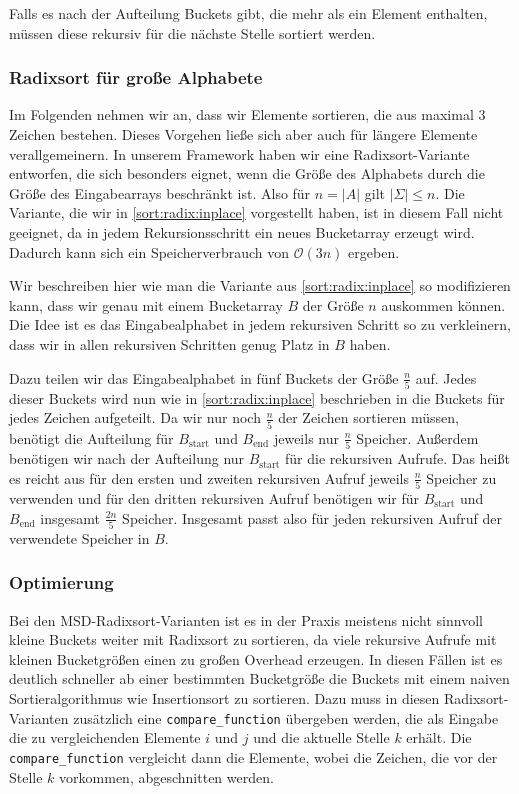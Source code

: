 Falls es nach der Aufteilung Buckets gibt, die mehr als ein Element enthalten,
müssen diese rekursiv für die nächste Stelle sortiert werden.

\subsubsection{Radixsort für große Alphabete}
\label{sort:radix:big_alph}

Im Folgenden nehmen wir an, dass wir Elemente sortieren,
die aus maximal $3$ Zeichen bestehen. Dieses Vorgehen ließe sich aber auch für längere Elemente verallgemeinern.
In unserem Framework haben wir eine Radixsort-Variante entworfen, die sich besonders eignet,
wenn die Größe des Alphabets durch die Größe des Eingabearrays beschränkt ist.
Also für $n=|A|$ gilt $|\Sigma| \le n$. Die Variante, die wir in \cref{sort:radix:inplace} vorgestellt haben,
ist in diesem Fall nicht geeignet, da in jedem Rekursionsschritt ein neues Bucketarray erzeugt wird.
Dadurch kann sich ein Speicherverbrauch von $\mathcal O(3n)$ ergeben.

Wir beschreiben hier wie man die Variante aus \cref{sort:radix:inplace} so modifizieren kann,
dass wir genau mit einem Bucketarray $B$ der Größe $n$ auskommen können.
Die Idee ist es das Eingabealphabet in jedem rekursiven Schritt so zu verkleinern,
dass wir in allen rekursiven Schritten genug Platz in $B$ haben.

Dazu teilen wir das Eingabealphabet in fünf Buckets der Größe $\frac{n}{5}$ auf.
Jedes dieser Buckets wird nun wie in \cref{sort:radix:inplace} beschrieben in die Buckets für jedes Zeichen aufgeteilt.
Da wir nur noch $\frac{n}{5}$ der Zeichen sortieren müssen,
benötigt die Aufteilung für $B_{\text{start}}$ und $B_{\text{end}}$ jeweils nur $\frac{n}{5}$ Speicher.
Außerdem benötigen wir nach der Aufteilung nur $B_{\text{start}}$ für die rekursiven Aufrufe.
Das heißt es reicht aus für den ersten und zweiten rekursiven Aufruf jeweils $\frac{n}{5}$ Speicher zu verwenden
und für den dritten rekursiven Aufruf benötigen wir für $B_{\text{start}}$ und $B_{\text{end}}$
insgesamt $\frac{2n}{5}$ Speicher. Insgesamt passt also für jeden rekursiven Aufruf der verwendete Speicher in $B$.

\subsubsection{Optimierung}

Bei den MSD-Radixsort-Varianten ist es in der Praxis meistens nicht sinnvoll kleine Buckets
weiter mit Radixsort zu sortieren, da viele rekursive Aufrufe mit kleinen Bucketgrößen einen zu großen Overhead erzeugen.
In diesen Fällen ist es deutlich schneller ab einer bestimmten Bucketgröße die Buckets mit einem
naiven Sortieralgorithmus wie Insertionsort zu sortieren.
Dazu muss in diesen Radixsort-Varianten zusätzlich eine \texttt{compare\_function} übergeben werden,
die als Eingabe die zu vergleichenden Elemente $i$ und $j$ und die aktuelle Stelle $k$ erhält.
Die \texttt{compare\_function} vergleicht dann die Elemente, wobei die Zeichen, die vor der Stelle $k$ vorkommen,
abgeschnitten werden.